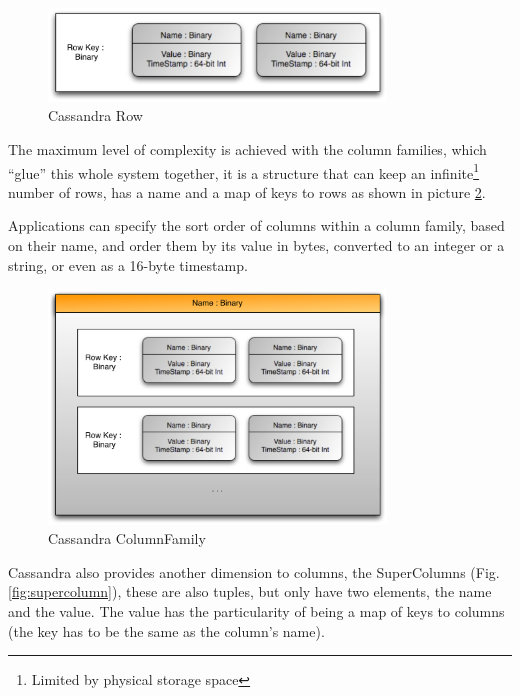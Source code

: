 \begin{figure}[!htb]
  \begin{center}
    \leavevmode
    \includegraphics[width=0.8\textwidth]{images/row}
  \end{center}
  \caption{Cassandra Row}
  \label{fig:row}
\end{figure}

The maximum level of complexity is achieved with the column families, which ``glue'' this whole system together, it is a structure that can keep an infinite\footnote{Limited by physical storage space} number of rows, has a name and a map of keys to rows as shown in picture \ref{fig:columnfamily}. 

Applications can specify the sort order of columns within a column family, based on their name, and order them by its value in bytes, converted to an integer or a string, or even as a 16-byte timestamp.

\begin{figure}[!htb]
  \begin{center}
    \leavevmode
    \includegraphics[width=0.8\textwidth]{images/columnfamily}
  \end{center}
  \caption{Cassandra ColumnFamily}
  \label{fig:columnfamily}
\end{figure}


Cassandra also provides another dimension to columns, the SuperColumns (Fig. \ref{fig:supercolumn}), these are also tuples, but only have two elements, the name and the value. The value has the particularity of being a map of keys to columns (the key has to be the same as the column's name).

